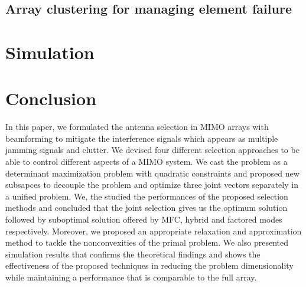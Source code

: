 \documentclass[journal]{IEEEtran}
\begin{document}
\subsection{Array clustering for managing element failure} 


\section{Simulation}\label{sec:sim}
\section{Conclusion}
\label{sec:conclusion}

In this paper, we formulated the antenna selection in MIMO arrays with beamforming to mitigate the interference signals which appears as multiple jamming signals and clutter. We devised four different selection approaches to be able to control different aspects of a MIMO system. We cast the problem as a determinant maximization problem with quadratic constraints and proposed new subsapces to decouple the problem and optimize three joint vectors separately in a unified problem. We, the studied the performances of the proposed selection methods and concluded that the joint selection gives us the optimum solution followed by suboptimal solution offered by MFC, hybrid and factored modes respectively. Moreover, we proposed an appropriate relaxation and approximation method to tackle the nonconvexities of the primal problem. We also presented simulation results that confirms the theoretical findings and shows the effectiveness of the proposed techniques in reducing the problem dimensionality while maintaining a performance that is comparable to the full array. 

% 
% 
\end{document}
